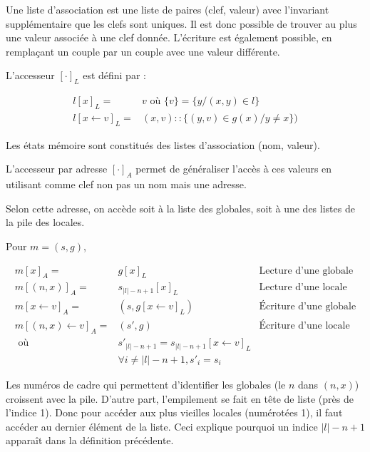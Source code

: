 \begin{definition}

  Une liste d'association est une liste de paires (clef, valeur) avec
  l'invariant supplémentaire que les clefs sont uniques. Il est donc possible de
  trouver au plus une valeur associée à une clef donnée. L'écriture est
  également possible, en remplaçant un couple par un couple avec une valeur
  différente.

  L'accesseur $[\cdot]_L$ est défini par :

  \begin{align*}
    l[x]_L     = & v \mbox{ où } \{v\} = \{y / (x, y) ∈ l\} \\
    l[x ← v]_L = & (x, v) :: \{ (y, v) ∈ g(x) / y ≠ x \})
  \end{align*}

\end{definition}

\begin{definition}

  Les états mémoire sont constitués des listes d'association (nom, valeur).

  L'accesseur par adresse $[\cdot]_A$ permet de généraliser l'accès à ces
  valeurs en utilisant comme clef non pas un nom mais une adresse.

  Selon cette adresse, on accède soit à la liste des globales, soit à une des
  listes de la pile des locales.

  Pour $m = (s, g)$,

  \begin{align*}
    m [x]_A          = & g[x]_L           & \textrm{Lecture d'une globale} \\
    m [(n, x)]_A     = & s_{|l|-n+1}[x]_L & \textrm{Lecture d'une locale} \\
    m [x ← v]_A      = & (s, g[x←v]_L)    & \textrm{Écriture d'une globale} \\
    m [(n, x) ← v]_A = & (s', g)          & \textrm{Écriture d'une locale} \\
           \mbox{ où } & s'_{|l|-n+1} = s_{|l|-n+1}[x ← v]_L \\
                       & ∀ i ≠ |l|-n+1, s'_i = s_i
  \end{align*}

\end{definition}

Les numéros de cadre qui permettent d'identifier les globales (le $n$ dans $(n,
x)$) croissent avec la pile. D'autre part, l'empilement se fait en tête de liste
(près de l'indice 1). Donc pour accéder aux plus vieilles locales (numérotées
1), il faut accéder au dernier élément de la liste. Ceci explique pourquoi un
indice $|l|-n+1$ apparaît dans la définition précédente.

